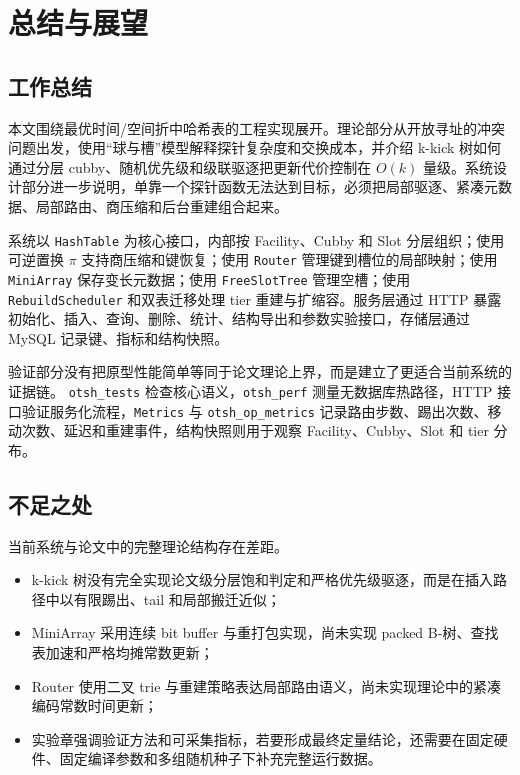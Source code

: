 \chapter{总结与展望}
\label{ch:concl}

\section{工作总结}
本文围绕最优时间/空间折中哈希表的工程实现展开。理论部分从开放寻址的冲突问题出发，使用“球与槽”模型解释探针复杂度和交换成本，并介绍 k-kick 树如何通过分层 cubby、随机优先级和级联驱逐把更新代价控制在 \(O(k)\) 量级。系统设计部分进一步说明，单靠一个探针函数无法达到目标，必须把局部驱逐、紧凑元数据、局部路由、商压缩和后台重建组合起来。

系统以 \texttt{HashTable} 为核心接口，内部按 Facility、Cubby 和 Slot 分层组织；使用可逆置换 \(\pi\) 支持商压缩和键恢复；使用 \texttt{Router} 管理键到槽位的局部映射；使用 \texttt{MiniArray} 保存变长元数据；使用 \texttt{FreeSlotTree} 管理空槽；使用 \texttt{RebuildScheduler} 和双表迁移处理 tier 重建与扩缩容。服务层通过 HTTP 暴露初始化、插入、查询、删除、统计、结构导出和参数实验接口，存储层通过 MySQL 记录键、指标和结构快照。

验证部分没有把原型性能简单等同于论文理论上界，而是建立了更适合当前系统的证据链。 \texttt{otsh\_tests} 检查核心语义，\texttt{otsh\_perf} 测量无数据库热路径，HTTP 接口验证服务化流程，\texttt{Metrics} 与 \texttt{otsh\_op\_metrics} 记录路由步数、踢出次数、移动次数、延迟和重建事件，结构快照则用于观察 Facility、Cubby、Slot 和 tier 分布。

\section{不足之处}
当前系统与论文中的完整理论结构存在差距。
\begin{itemize}
  \item k-kick 树没有完全实现论文级分层饱和判定和严格优先级驱逐，而是在插入路径中以有限踢出、tail 和局部搬迁近似；
  \item MiniArray 采用连续 bit buffer 与重打包实现，尚未实现 packed B-树、查找表加速和严格均摊常数更新；
  \item Router 使用二叉 trie 与重建策略表达局部路由语义，尚未实现理论中的紧凑编码常数时间更新；
  \item 实验章强调验证方法和可采集指标，若要形成最终定量结论，还需要在固定硬件、固定编译参数和多组随机种子下补充完整运行数据。
\end{itemize}

